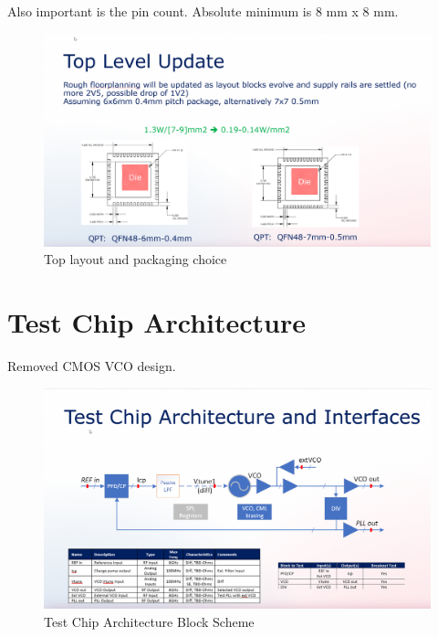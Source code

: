 \documentclass{article}
\begin{document}
Also important is the pin count. Absolute minimum is 8 mm x 8 mm.

\begin{figure}[ht!]
	\centering %
	\includegraphics[width=0.5\linewidth]{Figures/powerpoint-toplevel-packaging.png}
	\caption{Top layout and packaging choice}
	\label{fig:powerpoint-toplevel-packaging}
\end{figure}




\section{Test Chip Architecture}

Removed CMOS VCO design.

\begin{figure}[ht!]
	\centering %
	\includegraphics[width=0.5\linewidth]{Figures/test-chip-arch.png}
	\caption{Test Chip Architecture Block Scheme}
	\label{fig:test-chip-arch}
\end{figure}
\end{document}
